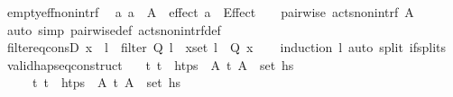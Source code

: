 \begin{isabellebody}
\endisatagproof
{\isafoldproof}%
%
\isadelimproof
\isanewline
%
\endisadelimproof
\isanewline
{}\isamarkupfalse%
\ empty{\isacharunderscore}{\kern0pt}eff{\isacharunderscore}{\kern0pt}non{\isacharunderscore}{\kern0pt}intrf{\isacharcolon}{\kern0pt}\isanewline
\ \ {\isachardoublequoteopen}{\isasymlbrakk}{\isasymAnd}a{\isachardot}{\kern0pt}\ a\ {\isasymin}\ A\ {\isasymLongrightarrow}\ effect\ a\ {\isacharequal}{\kern0pt}\ Effect\ {\isacharbrackleft}{\kern0pt}{\isacharbrackright}{\kern0pt}\ {\isacharbrackleft}{\kern0pt}{\isacharbrackright}{\kern0pt}{\isasymrbrakk}\ {\isasymLongrightarrow}\ pairwise\ acts{\isacharunderscore}{\kern0pt}non{\isacharunderscore}{\kern0pt}intrf\ A{\isachardoublequoteclose}\isanewline
%
\isadelimproof
\ \ %
\endisadelimproof
%
\isatagproof
{}\isamarkupfalse%
\ {\isacharparenleft}{\kern0pt}auto\ simp{\isacharcolon}{\kern0pt}\ pairwise{\isacharunderscore}{\kern0pt}def\ acts{\isacharunderscore}{\kern0pt}non{\isacharunderscore}{\kern0pt}intrf{\isacharunderscore}{\kern0pt}def{\isacharparenright}{\kern0pt}%
\endisatagproof
{\isafoldproof}%
%
\isadelimproof
\isanewline
%
\endisadelimproof
\isanewline
{}\isamarkupfalse%
\ filter{\isacharunderscore}{\kern0pt}eq{\isacharunderscore}{\kern0pt}consD{\isacharcolon}{\kern0pt}\ {\isachardoublequoteopen}x\ {\isacharhash}{\kern0pt}\ l{\isacharprime}{\kern0pt}\ {\isacharequal}{\kern0pt}\ filter\ Q\ l\ {\isasymLongrightarrow}\ x{\isasymin}set\ l\ {\isasymand}\ Q\ x{\isachardoublequoteclose}\isanewline
%
\isadelimproof
\ \ %
\endisadelimproof
%
\isatagproof
{}\isamarkupfalse%
\ {\isacharparenleft}{\kern0pt}induction\ l{\isacharparenright}{\kern0pt}\ {\isacharparenleft}{\kern0pt}auto\ split{\isacharcolon}{\kern0pt}\ if{\isacharunderscore}{\kern0pt}splits{\isacharparenright}{\kern0pt}%
\endisatagproof
{\isafoldproof}%
%
\isadelimproof
\isanewline
%
\endisadelimproof
\isanewline
{}\isamarkupfalse%
\ valid{\isacharunderscore}{\kern0pt}hap{\isacharunderscore}{\kern0pt}seq{\isacharunderscore}{\kern0pt}construct{\isacharcolon}{\kern0pt}\isanewline
\ \ \ {\isachardoublequoteopen}{\isasymAnd}t{\isachardot}{\kern0pt}\ t\ {\isasymin}\ htps\ {\isasymLongrightarrow}\ {\isasymexists}A{\isachardot}{\kern0pt}\ {\isacharparenleft}{\kern0pt}t{\isacharcomma}{\kern0pt}\ A{\isacharparenright}{\kern0pt}\ {\isasymin}\ set\ hs{\isachardoublequoteclose}\isanewline
\ \ \ \ \ {\isachardoublequoteopen}{\isasymAnd}t{\isachardot}{\kern0pt}\ t\ {\isasymin}\ htps\ {\isasymLongrightarrow}\ {\isasymexists}A{\isachardot}{\kern0pt}\ {\isacharparenleft}{\kern0pt}t{\isacharcomma}{\kern0pt}\ A{\isacharparenright}{\kern0pt}\ {\isasymin}\ set\ hs{\isacharprime}{\kern0pt}{\isachardoublequoteclose}\isanewline

\end{isabellebody}
